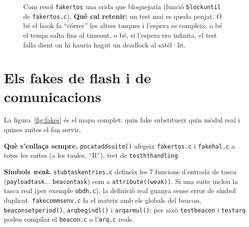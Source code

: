 \documentclass[11pt,a4paper]{article}
\DeclareRobustCommand{\_}{\textunderscore\allowbreak}
\newcommand{\cd}[1]{\texttt{#1}}
\begin{document}
\begin{figure}[p]
\caption{Com resol \cd{fake\_rtos} una crida que bloquejaria (funció \cd{block\_until} de
\cd{fake\_rtos.c}). \textbf{Què cal retenir:} un test mai es queda penjat. O bé el hook fa
``córrer'' les altres tasques i l'espera es compleix, o bé el temps salta fins al timeout, o bé, si
l'espera era infinita, el test falla dient on hi hauria hagut un deadlock al satèl·lit.}
\label{fig:rtos}
\end{figure}

\clearpage
\section{Els fakes de flash i de comunicacions}\label{sec:fakes}

La figura~\ref{fig:fakes} és el mapa complet: quin fake substitueix quin mòdul real i
quines suites el fan servir.

\textbf{Què s'enllaça sempre.} \cd{pocat\_add\_suite()} afegeix \cd{fake\_rtos.c} i
\cd{fake\_hal.c} a totes les suites (a les taules, ``R''), tret de \cd{test\_ht\_handling}.

\textbf{Símbols \emph{weak}.} \cd{stub\_task\_entries.c} defineix les 7 funcions d'entrada
de tasca (\cd{payload\_task}... \cd{beacon\_task}) com a \cd{\_\_attribute\_\_((weak))}. Si una
suite inclou la tasca real (per exemple \cd{obdh.c}), la definició real guanya sense error
de símbol duplicat. \cd{fake\_comms\_env.c} fa el mateix amb els globals del beacon,
\cd{beacon\_set\_period()}, \cd{arq\_begin\_dl()} i \cd{arq\_arm\_ul()}: per això
\cd{test\_beacon} i \cd{test\_arq} poden compilar el \cd{beacon.c} o l'\cd{arq.c} reals.
\end{document}
